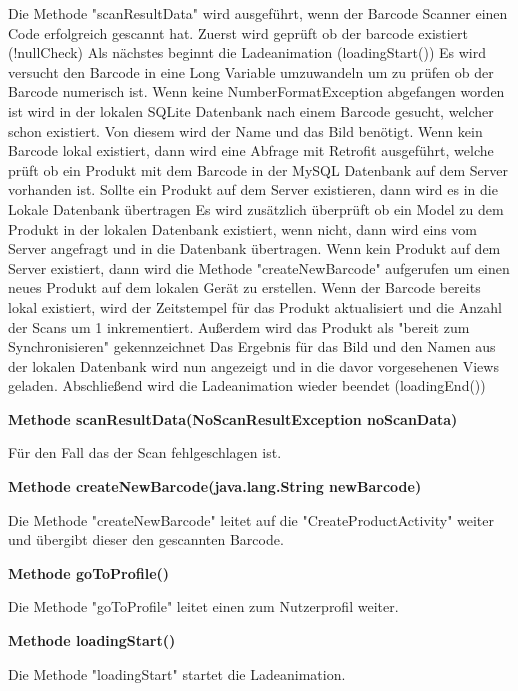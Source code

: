 \documentclass{scrartcl}
\begin{document}
\noindent Die Methode "scanResultData" wird ausgeführt, wenn der Barcode Scanner einen Code erfolgreich gescannt hat. Zuerst wird geprüft ob der barcode existiert (!nullCheck) Als nächstes beginnt die Ladeanimation (loadingStart()) Es wird versucht den Barcode in eine Long Variable umzuwandeln um zu prüfen ob der Barcode numerisch ist. Wenn keine NumberFormatException abgefangen worden ist wird in der lokalen SQLite Datenbank nach einem Barcode gesucht, welcher schon existiert. Von diesem wird der Name und das Bild benötigt. Wenn kein Barcode lokal existiert, dann wird eine Abfrage mit Retrofit ausgeführt, welche prüft ob ein Produkt mit dem Barcode in der MySQL Datenbank auf dem Server vorhanden ist. Sollte ein Produkt auf dem Server existieren, dann wird es in die Lokale Datenbank übertragen Es wird zusätzlich überprüft ob ein Model zu dem Produkt in der lokalen Datenbank existiert, wenn nicht, dann wird eins vom Server angefragt und in die Datenbank übertragen. Wenn kein Produkt auf dem Server existiert, dann wird die Methode "createNewBarcode" aufgerufen um einen neues Produkt auf dem lokalen Gerät zu erstellen. Wenn der Barcode bereits lokal existiert, wird der Zeitstempel für das Produkt aktualisiert und die Anzahl der Scans um 1 inkrementiert. Außerdem wird das Produkt als "bereit zum Synchronisieren" gekennzeichnet Das Ergebnis für das Bild und den Namen aus der lokalen Datenbank wird nun angezeigt und in die davor vorgesehenen Views geladen. Abschließend wird die Ladeanimation wieder beendet (loadingEnd()) \newline

\noindent\textbf{Methode scanResultData(NoScanResultException noScanData)}

\noindent Für den Fall das der Scan fehlgeschlagen ist. \newline

\noindent\textbf{Methode createNewBarcode(java.lang.String newBarcode)}

\noindent Die Methode "createNewBarcode" leitet auf die "CreateProductActivity" weiter und übergibt dieser den gescannten Barcode. \newline

\noindent\textbf{Methode goToProfile()}

\noindent Die Methode "goToProfile" leitet einen zum Nutzerprofil weiter. \newline

\noindent\textbf{Methode loadingStart()}

\noindent Die Methode "loadingStart" startet die Ladeanimation. \newline
\end{document}
